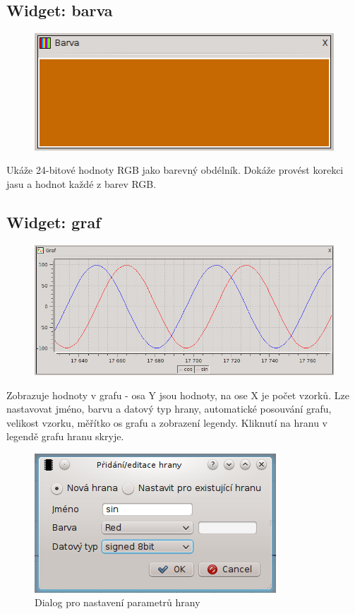 \documentclass[12pt, a4paper, oneside]{article}
\begin{document}
\subsection*{Widget: barva}
\begin{figure}[h]
\begin{center}
\includegraphics{img/w_col.png}
\end{center}
\end{figure}
Ukáže 24-bitové hodnoty RGB jako barevný obdélník. Dokáže provést korekci jasu a hodnot každé z barev RGB.

\newpage
{}
\subsection*{Widget: graf}
\begin{figure}[h]
\begin{center}
\includegraphics[scale=0.65]{img/w_graph.png}
\end{center}
\end{figure}
Zobrazuje hodnoty v grafu - osa Y jsou hodnoty, na ose X je počet vzorků. Lze nastavovat jméno, barvu a datový typ hrany, automatické posouvání grafu, velikost vzorku, měřítko os grafu a zobrazení legendy. Kliknutí na hranu v legendě grafu hranu skryje.
\begin{figure}[h]
\begin{center}
\includegraphics[scale=0.8]{img/w_graph_add.png}
\caption{Dialog pro nastavení parametrů hrany}
\end{center}
\end{figure}
\end{document}
